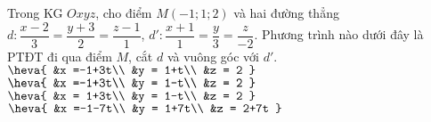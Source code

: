\begin{ex}%
	Trong KG $Oxyz$, cho điểm $M\left(-1;1;2\right)$ và hai đường thẳng $d\colon \dfrac{x-2}{3} = \dfrac{y+3}{2} = \dfrac{z-1}{1}$, $d'\colon \dfrac{x+1}{1} = \dfrac{y}{3} = \dfrac{z}{-2}$. Phương trình nào dưới đây là PTĐT đi qua điểm $M$, cắt $d$ và vuông góc với $d'$.
	\choice
	{$\heva{
	&x =-1+3t\\
	&y = 1+t\\
	&z = 2
	}$}
	{\True$\heva{
	&x =-1+3t\\
	&y = 1-t\\
	&z = 2
	}$}
	{$ \heva{
	&x = 1+3t\\
	&y = 1-t\\
	&z = 2
	}$}
	{$ \heva{
	&x =-1-7t\\
	&y = 1+7t\\
	&z = 2+7t
	}$}
\end{ex}
